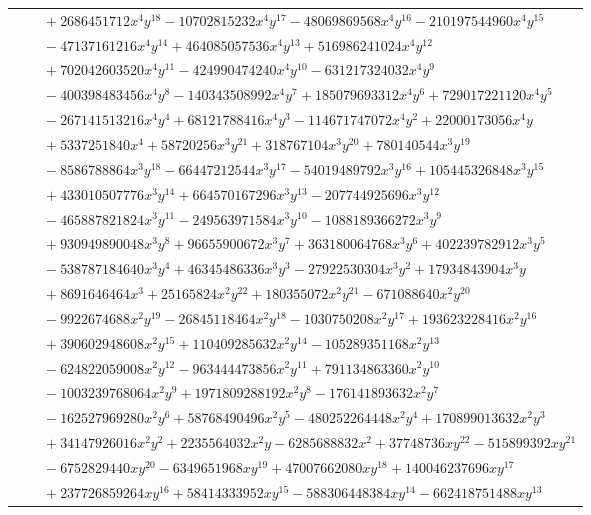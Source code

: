 \documentclass[11pt]{article}
\begin{document}
\begin{longtable}{@{}ll@{}}
 & $\quad +2686451712x^{4}y^{18}-10702815232x^{4}y^{17}-48069869568x^{4}y^{16}-210197544960x^{4}y^{15}$\\
 & $\quad -47137161216x^{4}y^{14}+464085057536x^{4}y^{13}+516986241024x^{4}y^{12}$\\
 & $\quad +702042603520x^{4}y^{11}-424990474240x^{4}y^{10}-631217324032x^{4}y^{9}$\\
 & $\quad -400398483456x^{4}y^{8}-140343508992x^{4}y^{7}+185079693312x^{4}y^{6}+729017221120x^{4}y^{5}$\\
 & $\quad -267141513216x^{4}y^{4}+68121788416x^{4}y^{3}-114671747072x^{4}y^{2}+22000173056x^{4}y$\\
 & $\quad +5337251840x^{4}+58720256x^{3}y^{21}+318767104x^{3}y^{20}+780140544x^{3}y^{19}$\\
 & $\quad -8586788864x^{3}y^{18}-66447212544x^{3}y^{17}-54019489792x^{3}y^{16}+105445326848x^{3}y^{15}$\\
 & $\quad +433010507776x^{3}y^{14}+664570167296x^{3}y^{13}-207744925696x^{3}y^{12}$\\
 & $\quad -465887821824x^{3}y^{11}-249563971584x^{3}y^{10}-1088189366272x^{3}y^{9}$\\
 & $\quad +930949890048x^{3}y^{8}+96655900672x^{3}y^{7}+363180064768x^{3}y^{6}+402239782912x^{3}y^{5}$\\
 & $\quad -538787184640x^{3}y^{4}+46345486336x^{3}y^{3}-27922530304x^{3}y^{2}+17934843904x^{3}y$\\
 & $\quad +8691646464x^{3}+25165824x^{2}y^{22}+180355072x^{2}y^{21}-671088640x^{2}y^{20}$\\
 & $\quad -9922674688x^{2}y^{19}-26845118464x^{2}y^{18}-1030750208x^{2}y^{17}+193623228416x^{2}y^{16}$\\
 & $\quad +390602948608x^{2}y^{15}+110409285632x^{2}y^{14}-105289351168x^{2}y^{13}$\\
 & $\quad -624822059008x^{2}y^{12}-963444473856x^{2}y^{11}+791134863360x^{2}y^{10}$\\
 & $\quad -1003239768064x^{2}y^{9}+1971809288192x^{2}y^{8}-176141893632x^{2}y^{7}$\\
 & $\quad -162527969280x^{2}y^{6}+58768490496x^{2}y^{5}-480252264448x^{2}y^{4}+170899013632x^{2}y^{3}$\\
 & $\quad +34147926016x^{2}y^{2}+2235564032x^{2}y-6285688832x^{2}+37748736xy^{22}-515899392xy^{21}$\\
 & $\quad -6752829440xy^{20}-6349651968xy^{19}+47007662080xy^{18}+140046237696xy^{17}$\\
 & $\quad +237726859264xy^{16}+58414333952xy^{15}-588306448384xy^{14}-662418751488xy^{13}$\\

\end{longtable}
\end{document}
